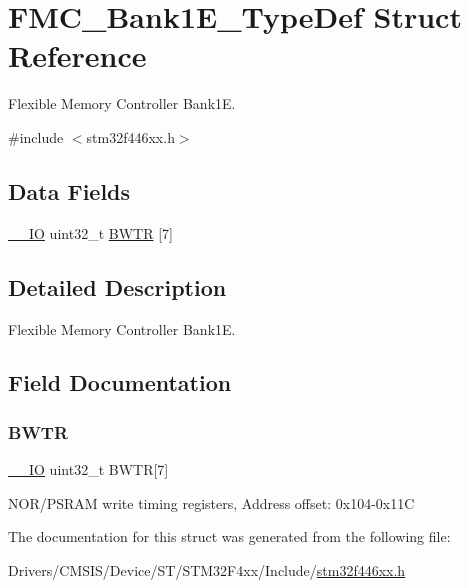 \hypertarget{struct_f_m_c___bank1_e___type_def}{}\section{F\+M\+C\+\_\+\+Bank1\+E\+\_\+\+Type\+Def Struct Reference}
\label{struct_f_m_c___bank1_e___type_def}


Flexible Memory Controller Bank1E.  




{\ttfamily \#include $<$stm32f446xx.\+h$>$}

\subsection*{Data Fields}
\begin{DoxyCompactItemize}
\item 
\mbox{\hyperlink{core__sc300_8h_aec43007d9998a0a0e01faede4133d6be}{\+\_\+\+\_\+\+IO}} uint32\+\_\+t \mbox{\hyperlink{struct_f_m_c___bank1_e___type_def_a20f13b79c0f8670af319af0c5ebd5c91}{B\+W\+TR}} \mbox{[}7\mbox{]}
\end{DoxyCompactItemize}


\subsection{Detailed Description}
Flexible Memory Controller Bank1E. 

\subsection{Field Documentation}
\mbox{\label{struct_f_m_c___bank1_e___type_def_a20f13b79c0f8670af319af0c5ebd5c91}} 
\subsubsection{\texorpdfstring{B\+W\+TR}{BWTR}}
{\footnotesize\ttfamily \mbox{\hyperlink{core__sc300_8h_aec43007d9998a0a0e01faede4133d6be}{\+\_\+\+\_\+\+IO}} uint32\+\_\+t B\+W\+TR\mbox{[}7\mbox{]}}

N\+O\+R/\+P\+S\+R\+AM write timing registers, Address offset\+: 0x104-\/0x11C 

The documentation for this struct was generated from the following file\+:\begin{DoxyCompactItemize}
\item 
Drivers/\+C\+M\+S\+I\+S/\+Device/\+S\+T/\+S\+T\+M32\+F4xx/\+Include/\mbox{\hyperlink{stm32f446xx_8h}{stm32f446xx.\+h}}\end{DoxyCompactItemize}
